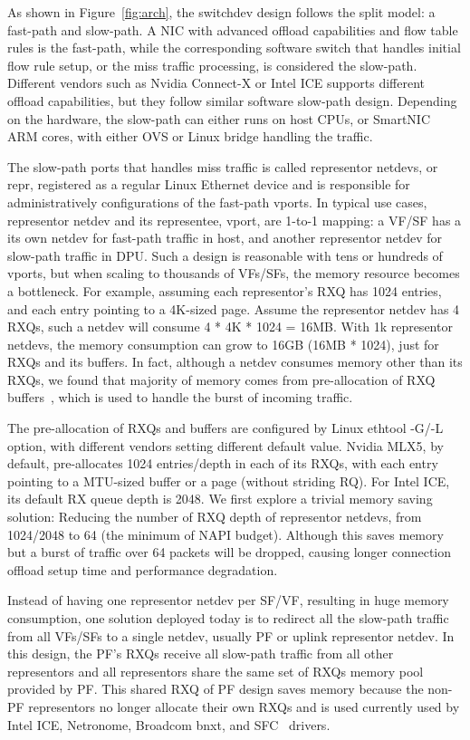 \documentclass[letterpaper]{article}
\begin{document}
As shown in Figure~\ref{fig:arch}, the switchdev design follows the
split model: a fast-path and slow-path.
A NIC with advanced offload capabilities and flow table rules is
the fast-path, while the corresponding software switch that handles
initial flow rule setup, or the miss traffic processing, is considered the
slow-path. Different vendors such as Nvidia Connect-X or Intel ICE
supports different offload capabilities, but they follow similar
software slow-path design. Depending on the hardware, the slow-path can
either runs on host CPUs, or SmartNIC ARM cores, with either OVS or
Linux bridge handling the traffic.

The slow-path ports that handles miss traffic is called representor
netdevs, or repr, registered as a regular Linux Ethernet device and is responsible
for administratively configurations of the fast-path vports.
In typical use cases, representor netdev and its representee, vport,
are 1-to-1 mapping: a VF/SF has a its own netdev for fast-path traffic
in host, and another representor netdev for slow-path traffic in DPU.
Such a design is reasonable with tens or hundreds of vports, but when scaling
to thousands of VFs/SFs, the memory resource becomes a bottleneck.
For example, assuming each representor's RXQ has 1024 entries, and each entry
pointing to a 4K-sized page. Assume the representor netdev has 4 RXQs,
such a netdev will consume 4 * 4K * 1024 = 16MB.
With 1k representor netdevs, the memory consumption can grow
to 16GB (16MB * 1024), just for RXQs and its buffers.
In fact, although a netdev consumes memory other than its RXQs,
we found that majority of memory comes from pre-allocation
of RXQ buffers~\cite{jakub}, which is used to handle the burst of incoming traffic.

The pre-allocation of RXQs and buffers are configured by Linux
ethtool -G/-L option, with different vendors setting different default
value. Nvidia MLX5, by default, pre-allocates 1024 entries/depth in each of
its RXQs, with each entry pointing to a MTU-sized buffer or a page
(without striding RQ). For Intel ICE, its default RX queue depth is 2048.
We first explore a trivial memory saving solution: Reducing the number
of RXQ depth of representor netdevs, from 1024/2048 to 64 (the minimum of NAPI
budget). Although this saves memory but a burst of traffic over 64 packets
will be dropped, causing longer connection offload setup time and
performance degradation.

Instead of having one representor netdev per SF/VF, resulting in
huge memory consumption, one solution deployed today is to 
redirect all the slow-path traffic from all VFs/SFs to a single netdev,
usually PF or uplink representor netdev. In this design, the PF's RXQs receive
all slow-path traffic from all other representors and all representors
share the same set of RXQs memory pool provided by PF.
This shared RXQ of PF design saves memory because the non-PF representors
no longer allocate their own RXQs and is used currently used by Intel ICE,
Netronome, Broadcom bnxt, and SFC~\cite{survey} drivers.
\end{document}
